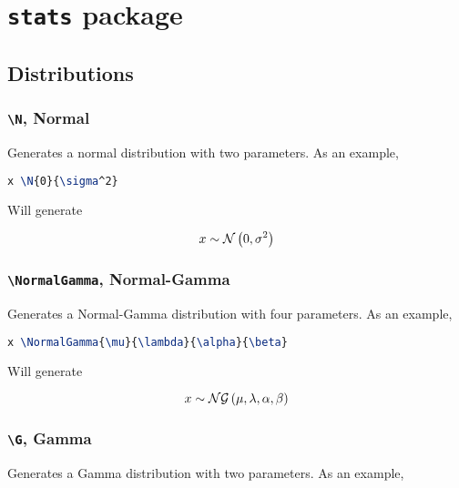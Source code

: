 \documentclass[]{article}
\title{}
\author{}
\begin{document}
\maketitle

\begin{abstract}

\end{abstract}

\section{\texttt{stats} package}

\subsection{Distributions}

\subsubsection{\texttt{\textbackslash N}, Normal}

Generates a normal distribution with two parameters.
As an example,

\begin{lstlisting}[language=TeX]
x \N{0}{\sigma^2}
\end{lstlisting}

Will generate

\[ x \sim \mathcal{N} \left( 0,\sigma^2 \right) \]

\subsubsection{\texttt{\textbackslash NormalGamma}, Normal-Gamma}

Generates a Normal-Gamma distribution with four parameters.
As an example,

\begin{lstlisting}[language=TeX]
x \NormalGamma{\mu}{\lambda}{\alpha}{\beta}
\end{lstlisting}

Will generate

\[ x \sim \mathcal{NG} \left(\mu,\lambda,\alpha,\beta\right) \]

\subsubsection{\texttt{\textbackslash G}, Gamma}

Generates a Gamma distribution with two parameters.
As an example,
\end{document}
